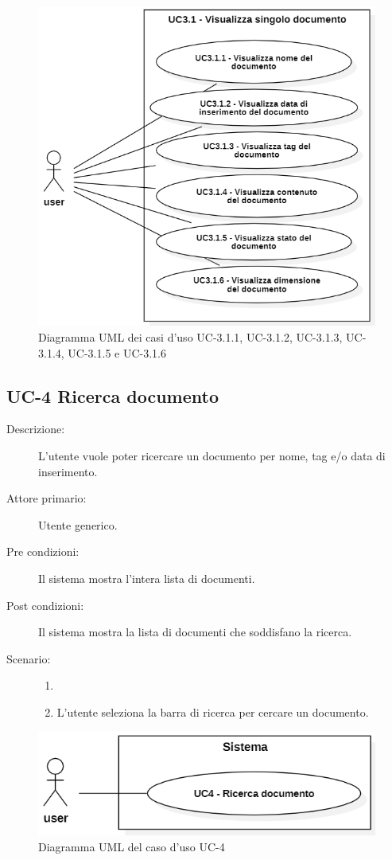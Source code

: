 \begin{figure}[H]
    \centering
    \includegraphics[width=0.8\linewidth]{UC3.1.1.PNG}
    \caption{Diagramma UML dei casi d'uso UC-3.1.1, UC-3.1.2, UC-3.1.3, UC-3.1.4, UC-3.1.5 e UC-3.1.6} 
\end{figure}

\subsection{UC-4 Ricerca documento}
\begin{description}
    \item[Descrizione:] L’utente vuole poter ricercare un documento per nome, tag e/o data di inserimento.
    \item[Attore primario:] Utente generico.
    \item[Pre condizioni:] Il sistema mostra l’intera lista di documenti.
    \item[Post condizioni:] Il sistema mostra la lista di documenti che soddisfano la ricerca.
    \item[Scenario:]
    \begin{enumerate}
        \item[]
        \item L’utente seleziona la barra di ricerca per cercare un documento.
    \end{enumerate}
\end{description}

\begin{figure}[H]
    \centering
    \includegraphics[width=0.8\linewidth]{UC4.PNG} %
    \caption{Diagramma UML del caso d'uso UC-4}
    \label{fig:UC4}
\end{figure}

